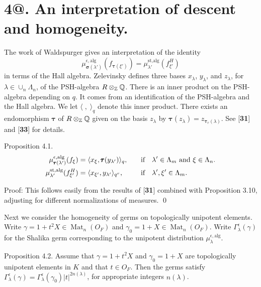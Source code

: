 \documentclass{amsart}
\begin{document}
\section{{\bf 4@.  An interpretation of descent and homogeneity.}}

\medskip
\noindent
The work of Waldspurger gives an interpretation of the identity
  $$ \mu_{\pmb\sigma(\lambda')}^{\epsilon,\text{alg}} 
    (f_{\pmb\tau(\xi')}) =
    \mu_{\lambda'}^{\text{st,alg}}(f_{\xi'}^{H}) $$
in terms of the Hall algebra.
Zelevinsky defines three bases
  $ x_{\lambda} $,
  $ y_{\lambda} $, and
  $ z_{\lambda} $,
  for $\lambda \in \cup_n \Lambda_n$,
of the PSH-algebra $R\otimes_{\Bbb Z} {\Bbb Q}$.
There is an inner product on the PSH-algebra depending on $q$. It comes
from an identification of the PSH-algebra and the Hall algebra.
We let
  $ \langle \;,\; \rangle_q $
denote this inner product.
There exists an endomorphism
  $ \pmb\tau $
of 
  $ R \otimes_{\Bbb Z} {\Bbb Q} $
given on the basis
  $ z_{\lambda} $
by
  $ \pmb\tau (z_{\lambda}) =
    z_{\pmb\tau_r (\lambda) } $.
See [{\bf 31}] and [{\bf 33}] for details.


\proclaim Proposition {4.1}.
%
\begin{alignat*}{2}
  \mu_{\pmb\tau(\lambda')}^{\epsilon, \text{{\rm alg}}} (f_{\xi})
&=
  \langle
    x_{\xi}, \pmb\tau (y_{\lambda'}) 
  \rangle_q, \quad
&&\text{{\rm if}} \quad
  \lambda' \in \Lambda_m \text{\rm \ and }
  \xi \in \Lambda_n.
\\
  \mu_{\lambda'}^{\text{{\rm st,alg}}} (f^H_{\xi'})
&=
  \langle
    x_{\xi'}, y_{\lambda'} 
  \rangle_{q^r}, \quad
&&\text{{\rm if}} \quad
  \lambda', \xi' \in \Lambda_m.
\end{alignat*}
%
\finishproclaim

\pproclaim Proof:
  This follows easily from the results of
  [{\bf 31}] combined with Proposition 3.10, adjusting
for different normalizations of measures.
\qed
\finishproclaim

Next we consider the homogeneity of germs on topologically 
  unipotent elements.
Write
  $ \gamma = 1 + t^2 X  \in \operatorname{Mat}_n (O_F) $
and
  $ \gamma_0 = 1 + X \in \operatorname{Mat}_n (O_F) $.
Write $\Gamma_\lambda^\epsilon(\gamma)$ for the Shalika germ
corresponding to the unipotent distribution $\mu_\lambda^{\epsilon,\text{alg}}$.

\proclaim Proposition {4.2}.
Assume that 
  $ \gamma =1+t^2X$
and
  $ \gamma_0 =1+X$
are topologically unipotent elements in $K$ and that 
  $ t \in O_F $.
Then the germs satisfy
  $ \Gamma_{\lambda}^{\epsilon} (\gamma) =
    \Gamma_{\lambda}^{\epsilon} (\gamma_0) 
    |t|^{2n (\lambda)} $,
for appropriate integers
  $ n(\lambda) $.
\finishproclaim
\end{document}
